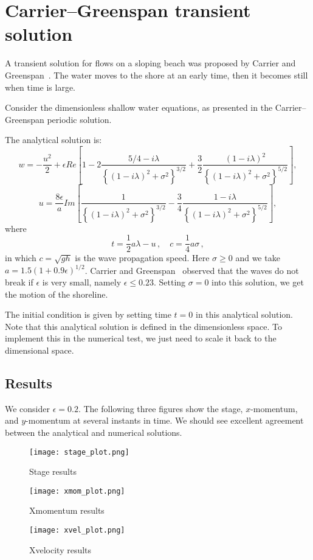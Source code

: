 
\section{Carrier--Greenspan transient solution}

A transient solution for flows on a sloping beach was proposed by Carrier and Greenspan~\cite{CG1958}. The water moves to the shore at an early time, then it becomes still when time is large.

Consider the dimensionless shallow water equations, as presented in the Carrier--Greenspan periodic solution.

The analytical solution is:
\begin{equation}
w = - \frac{u^2}{2} + \epsilon {Re} 
\left[1- 2 \frac{5/4 - i\lambda}{\left\{(1-i\lambda)^2 + \sigma^2 \right\}^{3/2}}
+ \frac32 \frac{(1-i\lambda)^2}{\left\{ (1-i\lambda)^2 + \sigma^2 \right\}^{5/2}} \right],
\end{equation}
\begin{equation}
u = \frac{8\epsilon}{a} {Im} \left[ \frac{1}{\left\{(1-i\lambda)^2 + \sigma^2 \right\}^{3/2}}
- \frac34 \frac{1-i\lambda}{\left\{ (1-i\lambda)^2 + \sigma^2 \right\}^{5/2}}    \right],
\end{equation}
where
\begin{equation}
t = \frac12 a\lambda -u\,, \quad c = \frac14 a\sigma\,,
\end{equation}
in which $c=\sqrt{gh}$ is the wave propagation speed.
Here $\sigma \geq 0$ and we take $a=1.5(1+0.9\epsilon)^{1/2}$. Carrier and Greenspan~\cite{CG1958} observed that the waves do not break if $\epsilon$ is very small, namely $\epsilon \leq 0.23$. Setting $\sigma=0$ into this solution, we get the motion of the shoreline.

The initial condition is given by setting time $t=0$ in this analytical solution. Note that this analytical solution is defined in the dimensionless space. To implement this in the numerical test, we just need to scale it back to the dimensional space.

\subsection{Results}

We consider $\epsilon=0.2$. The following three figures show the stage, $x$-momentum, and $y$-momentum at several instants in time. We should see excellent agreement between the analytical and numerical solutions.

\begin{figure}
\begin{center}
\texttt{[image: stage\_plot.png]}
\end{center}
\caption{Stage results}
\end{figure}

\begin{figure}
\begin{center}
\texttt{[image: xmom\_plot.png]}
\end{center}
\caption{Xmomentum results}
\end{figure}

\begin{figure}
\begin{center}
\texttt{[image: xvel\_plot.png]}
\end{center}
\caption{Xvelocity results}
\end{figure}

\endinput
